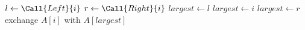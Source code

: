\begin{algorithmic}
\State $l \gets \Call{Left}{i}$
\State $r \gets \Call{Right}{i}$
  \State $largest \gets l$
\Else
  \State $largest \gets i$
\EndIf
{}
  \State $largest \gets r$
\EndIf
{}
  \State exchange $A[i]$ with $A[largest]$
  \State {}
\EndIf
\EndFunction
\end{algorithmic}